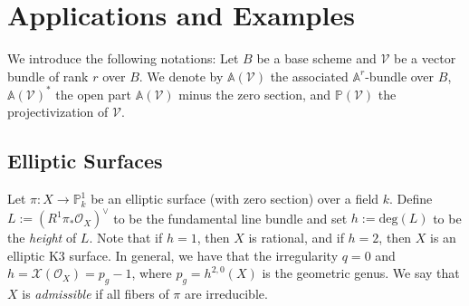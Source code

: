 \documentclass[letter, 11pt]{article}
\theoremstyle{plain}
\theoremstyle{definition}
\newtheorem{remark}[subsubsection]{Remark}
\newcommand{\IA}{\mathbb{A}}
\newcommand{\IC}{\mathbb{C}}
\newcommand{\IP}{\mathbb{P}}
\renewcommand{\deg}{\mathrm{deg}}
\newcommand{\<}{\langle}
\renewcommand{\>}{\rangle}
\newcommand{\sV}{\mathcal{V}}
\newcommand{\sX}{\mathcal{X}}
\newcommand{\sS}{\mathcal{S}}
\newcommand{\sO}{\mathcal{O}}
\begin{document}

\section{Applications and Examples}
\label{sec: examples}
We introduce the following notations: Let $B$ be a base scheme and $\sV$ be a vector bundle of rank $r$ over $B$. We denote by $\IA(\sV)$ the associated $\IA^r$-bundle over $B$, $\IA(\sV)^*$ the open part $\IA(\sV)$ minus the zero section, and $\IP(\sV)$ the projectivization of $\sV$. 

\subsection{Elliptic Surfaces}
Let $\pi : X \to \IP^1_k$ be an elliptic surface (with zero section) over a field $k$. Define $L := (R^1 \pi_* \sO_X)^\vee$ to be the fundamental line bundle and set $h := \deg(L)$ to be the \textit{height} of $L$. Note that if $h = 1$, then $X$ is rational, and if $h = 2$, then $X$ is an elliptic K3 surface. In general, we have that the irregularity $q = 0$ and $h = \sX(\sO_X) = p_g - 1$, where $p_g = h^{2, 0}(X)$ is the geometric genus. We say that $X$ is \textit{admissible} if all fibers of $\pi$ are irreducible. 
\end{document}
